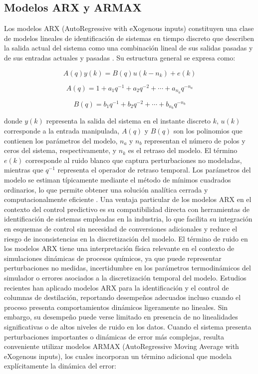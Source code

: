 \subsection{Modelos ARX y ARMAX}

Los modelos ARX (AutoRegressive with eXogenous inputs) constituyen una clase de modelos lineales de identificación de sistemas en tiempo discreto que describen la salida actual del sistema como una combinación lineal de sus salidas pasadas y de sus entradas actuales y pasadas \cite{ref11}. Su estructura general se expresa como:

\begin{equation}
A(q) y(k) = B(q) u(k-n_k) + e(k)
\label{eq:arx_general}
\end{equation}

\begin{equation}
A(q) = 1 + a_1 q^{-1} + a_2 q^{-2} + \cdots + a_{n_a} q^{-n_a}
\label{eq:arx_A}
\end{equation}

\begin{equation}
B(q) = b_1 q^{-1} + b_2 q^{-2} + \cdots + b_{n_b} q^{-n_b}
\label{eq:arx_B}
\end{equation}

donde $y(k)$ representa la salida del sistema en el instante discreto $k$, $u(k)$ corresponde a la entrada manipulada, $A(q)$ y $B(q)$ son los polinomios que contienen los parámetros del modelo, $n_a$ y $n_b$ representan el número de polos y ceros del sistema, respectivamente, y $n_k$ es el retraso del modelo. El término $e(k)$ corresponde al ruido blanco que captura perturbaciones no modeladas, mientras que $q^{-1}$ representa el operador de retraso temporal. Los parámetros del modelo se estiman típicamente mediante el método de mínimos cuadrados ordinarios, lo que permite obtener una solución analítica cerrada y computacionalmente eficiente \cite{ref11}. Una ventaja particular de los modelos ARX en el contexto del control predictivo es su compatibilidad directa con herramientas de identificación de sistemas empleadas en la industria, lo que facilita su integración en esquemas de control sin necesidad de conversiones adicionales y reduce el riesgo de inconsistencias en la discretización del modelo. El término de ruido en los modelos ARX tiene una interpretación física relevante en el contexto de simulaciones dinámicas de procesos químicos, ya que puede representar perturbaciones no medidas, incertidumbre en los parámetros termodinámicos del simulador o errores asociados a la discretización temporal del modelo. Estudios recientes han aplicado modelos ARX para la identificación y el control de columnas de destilación, reportando desempeños adecuados incluso cuando el proceso presenta comportamientos dinámicos ligeramente no lineales. Sin embargo, su desempeño puede verse limitado en presencia de no linealidades significativas o de altos niveles de ruido en los datos. Cuando el sistema presenta perturbaciones importantes o dinámicas de error más complejas, resulta conveniente utilizar modelos ARMAX (AutoRegressive Moving Average with eXogenous inputs), los cuales incorporan un término adicional que modela explícitamente la dinámica del error:

